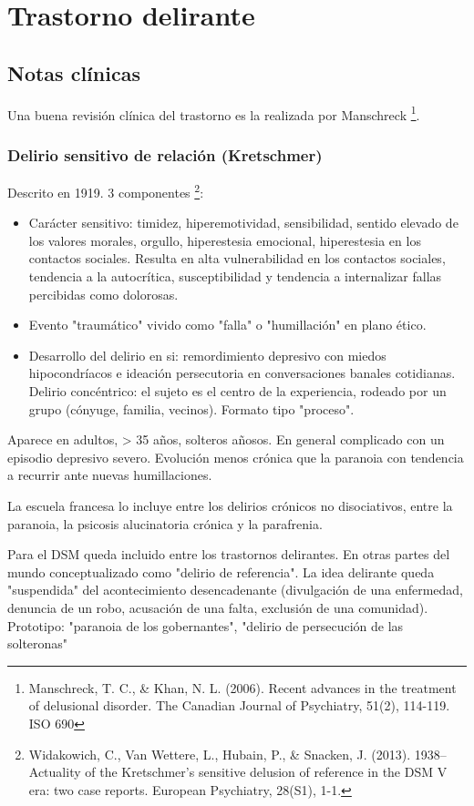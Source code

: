 \chapter{Trastorno delirante}
\section*{Notas clínicas}
Una buena revisión clínica del trastorno es la realizada por Manschreck \footnote{Manschreck, T. C., \& Khan, N. L. (2006). Recent advances in the treatment of delusional disorder. The Canadian Journal of Psychiatry, 51(2), 114-119. ISO 690}.
\subsection*{Delirio sensitivo de relación (Kretschmer)}
Descrito en 1919. 3 componentes \footnote{Widakowich, C., Van Wettere, L., Hubain, P., \& Snacken, J. (2013). 1938–Actuality of the Kretschmer's sensitive delusion of reference in the DSM V era: two case reports. European Psychiatry, 28(S1), 1-1.}:
\begin{itemize}
	\item Carácter sensitivo: timidez, hiperemotividad, sensibilidad, sentido elevado de los valores morales, orgullo, hiperestesia emocional, hiperestesia en los contactos sociales. Resulta en alta vulnerabilidad en los contactos sociales, tendencia a la autocrítica, susceptibilidad y tendencia a internalizar fallas percibidas como dolorosas.
	\item Evento "traumático" vivido como "falla" o "humillación" en plano ético.
	\item  Desarrollo del delirio en si: remordimiento depresivo con miedos hipocondríacos e ideación persecutoria en conversaciones banales cotidianas. Delirio concéntrico: el sujeto es el centro de la experiencia, rodeado por un grupo (cónyuge, familia, vecinos). Formato tipo "proceso".
\end{itemize}
Aparece en adultos, > 35 años, solteros añosos. En general complicado con un episodio depresivo severo. Evolución menos crónica que la paranoia con tendencia a recurrir ante nuevas humillaciones.

La escuela francesa lo incluye entre los delirios crónicos no disociativos, entre la paranoia, la psicosis alucinatoria crónica y la parafrenia.

Para el DSM queda incluido entre los trastornos delirantes. En otras partes del mundo conceptualizado como "delirio de referencia". La idea delirante queda "suspendida" del acontecimiento desencadenante (divulgación de una enfermedad, denuncia de un robo, acusación de una falta, exclusión de una comunidad). Prototipo: "paranoia de los gobernantes", "delirio de persecución de las solteronas"
